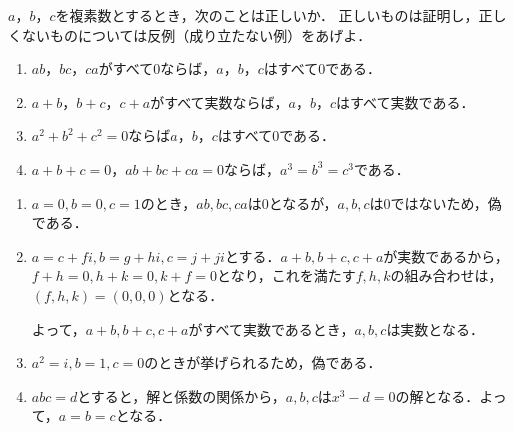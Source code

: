 \begin{problem}
$a$，$b$，$c$を複素数とするとき，次のことは正しいか．
正しいものは証明し，正しくないものについては反例（成り立たない例）をあげよ．
\begin{enumerate}
\item $ab$，$bc$，$ca$がすべて0ならば，$a$，$b$，$c$はすべて0である．
\item $a+b$，$b+c$，$c+a$がすべて実数ならば，$a$，$b$，$c$はすべて実数である．
\item $a^2+b^2+c^2=0$ならば$a$，$b$，$c$はすべて0である．
\item $a+b+c=0$，$ab+bc+ca=0$ならば，$a^3=b^3=c^3$である．
\end{enumerate}
\end{problem}

\begin{enumerate}
  \item $a=0,b=0,c=1$のとき，$ab,bc,ca$は0となるが，$a,b,c$は0ではないため，偽である．
  \item $a = c+fi, b=g+hi, c=j+ji$とする．$a+b, b+c, c+a$が実数であるから，$f+h=0,h+k=0,k+f=0$となり，これを満たす$f,h,k$の組み合わせは，$(f,h,k)=(0,0,0)$となる．

  よって，$a+b,b+c,c+a$がすべて実数であるとき，$a,b,c$は実数となる．
  \item $a^2 = i, b=1, c=0$のときが挙げられるため，偽である．
  \item $abc = d$とすると，解と係数の関係から，$a,b,c$は$x^3-d = 0$の解となる．よって，$a=b=c$となる．
\end{enumerate}
